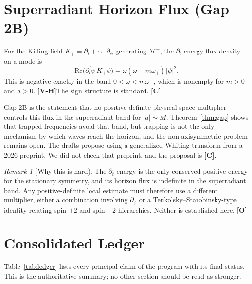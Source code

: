 \documentclass[11pt, a4paper]{article}
\newcommand{\VH}{\textcolor{vh}{\textbf{[V-H]}}}
\newcommand{\CC}{\textcolor{cc}{\textbf{[C]}}}
\newcommand{\OO}{\textcolor{oo}{\textbf{[O]}}}
\theoremstyle{remark}
\newtheorem{remark}[theorem]{Remark}
\theoremstyle{definition}
\begin{document}
\section{Superradiant Horizon Flux (Gap 2B)}
\label{sec:gap2b}

For the Killing field $K_+ = \partial_t + \omega_+\partial_\phi$ generating $\mathcal{H}^+$, the $\partial_t$-energy flux density on a mode is
\[
\mathrm{Re}\bigl(\overline{\partial_t\psi}\,K_+\psi\bigr) = \omega(\omega - m\omega_+)|\psi|^2.
\]
This is negative exactly in the band $0 < \omega < m\omega_+$, which is nonempty for $m>0$ and $a>0$. \VH The sign structure is standard. \CC

Gap 2B is the statement that no positive-definite physical-space multiplier controls this flux in the superradiant band for $|a|\sim M$. Theorem~\ref{thm:gap} shows that trapped frequencies avoid that band, but trapping is not the only mechanism by which waves reach the horizon, and the non-axisymmetric problem remains open. The drafts propose using a generalized Whiting transform from a 2026 preprint. We did not check that preprint, and the proposal is \CC.

\begin{remark}[Why this is hard]
The $\partial_t$-energy is the only conserved positive energy for the stationary symmetry, and its horizon flux is indefinite in the superradiant band. Any positive-definite local estimate must therefore use a different multiplier, either a combination involving $\partial_\phi$ or a Teukolsky--Starobinsky-type identity relating spin $+2$ and spin $-2$ hierarchies. Neither is established here. \OO
\end{remark}

\section{Consolidated Ledger}
\label{sec:ledger}

Table~\ref{tab:ledger} lists every principal claim of the program with its final status. This is the authoritative summary; no other section should be read as stronger.
\end{document}
